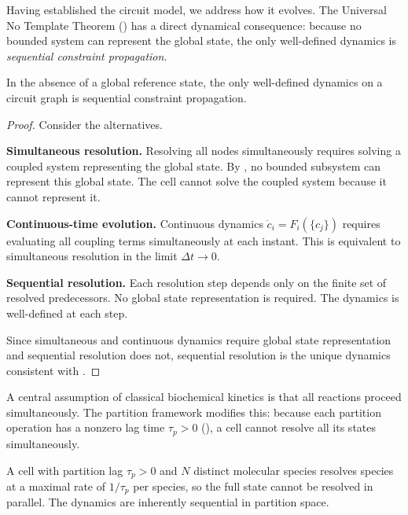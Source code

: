 Having established the circuit model, we address how it evolves.  The
Universal No Template Theorem () has a
direct dynamical consequence: because no bounded system can represent the
global state, the only well-defined dynamics is \emph{sequential constraint
propagation}.

\begin{theorem}
\label{thm:sequential-necessary}
In the absence of a global reference state, the only well-defined dynamics
on a circuit graph is sequential constraint propagation.
\end{theorem}

\begin{proof}
Consider the alternatives.

\textbf{Simultaneous resolution.}  Resolving all nodes simultaneously
requires solving a coupled system representing the global state.  By
, no bounded subsystem can represent this
global state.  The cell cannot solve the coupled system because it cannot
represent it.

\textbf{Continuous-time evolution.}  Continuous dynamics
$\dot{c}_i = F_i(\{c_j\})$ requires evaluating all coupling terms
simultaneously at each instant.  This is equivalent to simultaneous
resolution in the limit $\Delta t \to 0$.

\textbf{Sequential resolution.}  Each resolution step depends only on the
finite set of resolved predecessors.  No global state representation is
required.  The dynamics is well-defined at each step.

Since simultaneous and continuous dynamics require global state
representation and sequential resolution does not, sequential resolution
is the unique dynamics consistent with .
\end{proof}

A central assumption of classical biochemical kinetics is that all reactions
proceed simultaneously.  The partition framework modifies this: because each
partition operation has a nonzero lag time $\tau_p > 0$
(), a cell cannot resolve all its states
simultaneously.

\begin{proposition}
\label{prop:sequential}
A cell with partition lag $\tau_p > 0$ and $N$ distinct molecular species
resolves species at a maximal rate of $1/\tau_p$ per species, so the full
state cannot be resolved in parallel.  The dynamics are inherently sequential
in partition space.
\end{proposition}


